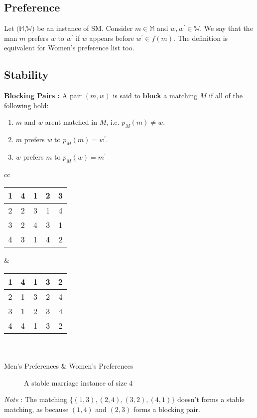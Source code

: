\subsection{Preference}
    Let $\mathbb{(M}$,$\mathbb{W)}$ be an instance of SM. Consider $m\in \mathbb{M}$ and $w,w^\prime \in \mathbb{W}$. We say that the man  $m$ prefers $w$ to $w^\prime$ if $w$ appears before $w^\prime \in f(m)$. The definition is equivalent for Women's preference list too\cite{dickerson}.
 
\subsection{Stability}
\textbf{Blocking Pairs : } A pair $(m,w)$ is said to \textbf{block} a matching $M$ if all of the following hold:
    \begin{enumerate}
  \item $m$ and $w$ arent matched in $M$, i.e. $p_M(m) \neq w$.
  \item $m$ prefers $w$ to $p_M(m) = w^\prime$.
  \item $w$ prefers $m$ to  $p_M(w) = m^\prime$ 
\end{enumerate}


\begin{center}
\begin{tabular}{ cc }   %
\begin{tabular}{ |c||c|c|c|c| } 
\hline
1 & 4 & 1 & 2 & 3\\
\hline
2 & 2 & 3 & 1 & 4\\
\hline
3 & 2 & 4 & 3 & 1\\
\hline
4 & 3 & 1 & 4 & 2\\
\hline
\end{tabular} &  %
\begin{tabular}{ |c||c|c|c|c| } 
\hline
1 & 4 & 1 & 3 & 2\\
\hline
2 & 1 & 3 & 2 & 4\\
\hline
3 & 1 & 2 & 3 & 4\\
\hline
4 & 4 & 1 & 3 & 2\\
\hline
\end{tabular} \\ \\
Men's Preferences & Women's Preferences
\end{tabular}
\begin{figure}[ht]
  \caption{A stable marriage instance of size $4$}
  \label{FIG_1_7}
\end{figure}
\end{center}
\textit{Note} : The matching $\{(1,3),(2,4),(3,2),(4,1)\}$ doesn't forms a stable matching, as because $(1,4)$ and $(2,3)$ forms a blocking pair.
 
